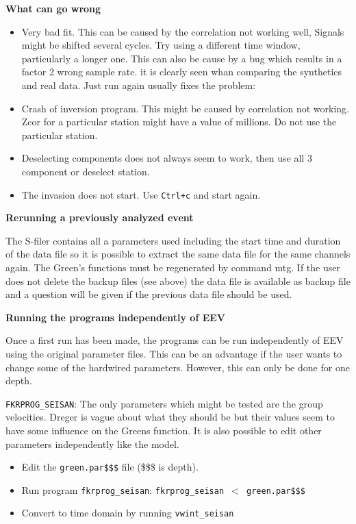 \textbf{What can go wrong}

\begin{itemize}
\item 
Very bad fit. This can be caused by the correlation not working well, Signals might be shifted several cycles. Try using a different time window, particularly a longer one.
This can also be cause by a bug which results in a factor 2 wrong sample rate. it is clearly seen whan comparing the synthetics and real data. Just run again usually fixes the problem:
\item 
Crash of inversion program. This might be caused by correlation not working. Zcor for a particular station might have  a value of millions. Do not use the particular station.
\item 
Deselecting components does not always seem to work, then use all 3 component or deselect station.
\item 
The invasion does not start. Use \texttt{Ctrl+c} and start again. 

\end{itemize}

\textbf{Rerunning a previously analyzed event}

The S-filer contains all a parameters used including the start time and duration of the data file so it is possible to extract the same data file for the same channels again. The Green's functions must be regenerated by command mtg. If the user does not delete the backup files (see above) the data file is available as backup file and a question will be given if the previous data file should be used.


\textbf{Running the programs independently of EEV}

Once a first run has been made, the programs can be run independently of EEV using the original parameter files. This can be an advantage if the user wants to change some of the hardwired parameters. However, this can only be done for one depth.

\texttt{FKRPROG\_SEISAN}: The only parameters which might be tested are the group velocities. Dreger is vague about what they should be but their values seem to have some influence on the Greens function. It is also possible to edit other parameters independently like the model.

\begin{itemize}
\item 
Edit the \texttt{green.par\$\$\$} file (\$\$\$ is depth). 
\item 
Run program \texttt{fkrprog\_seisan}: \texttt{fkrprog\_seisan $<$ green.par\$\$\$}
\item 
Convert to time domain by running \texttt{vwint\_seisan}
\end{itemize}

